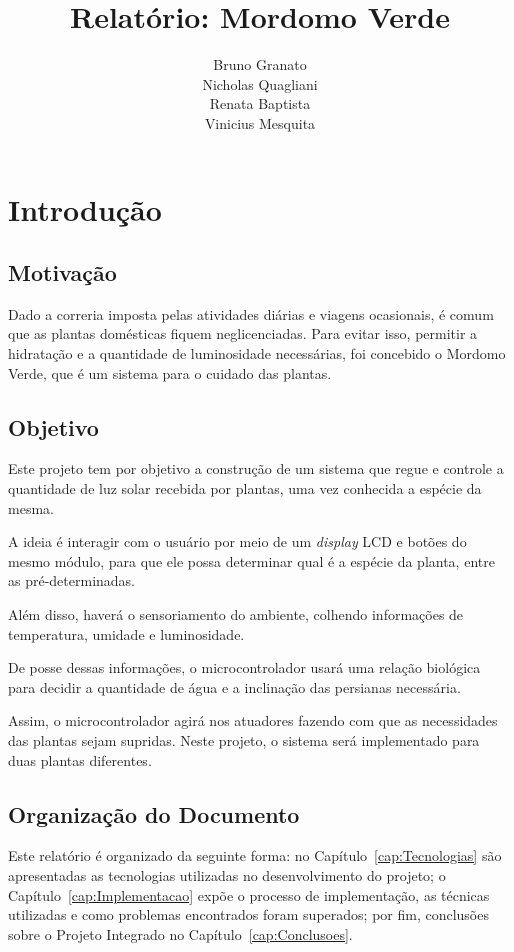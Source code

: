 \documentclass[a4paper,12pt]{report}
\title{ Relatório: Mordomo Verde \\}
\author{Bruno Granato \\
	Nicholas Quagliani\\
	Renata Baptista\\
	Vinicius Mesquita}
\begin{document}
\maketitle


\tableofcontents
\cleardoublepage
\chapter{Introdução}
	\section{Motivação}
		Dado a correria imposta pelas atividades diárias e viagens ocasionais, é comum que as plantas domésticas fiquem neglicenciadas. Para evitar isso, permitir a hidratação e a quantidade de luminosidade necessárias, foi concebido o Mordomo Verde, que é um sistema para o cuidado das plantas.
	\section{Objetivo}
		Este projeto tem por objetivo a construção de um sistema que regue e controle a quantidade de luz solar recebida por plantas, uma vez conhecida a espécie da mesma.
		
		A ideia é interagir com o usuário por meio de um \textit{display} LCD e botões do mesmo módulo, para que ele possa determinar qual é a espécie da planta, entre as pré-determinadas. 
		
		Além disso, haverá o sensoriamento do ambiente, colhendo informações de temperatura, umidade e luminosidade.
		
		De posse dessas informações, o microcontrolador usará uma relação biológica para decidir a quantidade de água e a inclinação das persianas necessária. 
		
		Assim, o microcontrolador agirá nos atuadores fazendo com que as necessidades das plantas sejam supridas. Neste projeto, o sistema será implementado para duas plantas diferentes.
	\section{Organização do Documento}
	    Este relatório é organizado da seguinte forma: no Capítulo~\ref{cap:Tecnologias} são apresentadas as tecnologias utilizadas no desenvolvimento do projeto; o Capítulo~\ref{cap:Implementacao} expõe o processo de implementação, as técnicas utilizadas e como problemas encontrados foram superados; por fim, conclusões sobre o Projeto Integrado no Capítulo~\ref{cap:Conclusoes}.
\end{document}
